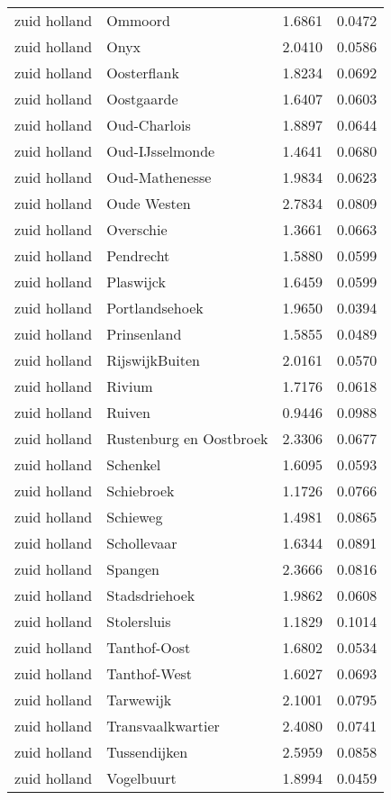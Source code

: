\begin{longtable}{llcc}
zuid holland & Ommoord & 1.6861 & 0.0472 \\
zuid holland & Onyx & 2.0410 & 0.0586 \\
zuid holland & Oosterflank & 1.8234 & 0.0692 \\
zuid holland & Oostgaarde & 1.6407 & 0.0603 \\
zuid holland & Oud-Charlois & 1.8897 & 0.0644 \\
zuid holland & Oud-IJsselmonde & 1.4641 & 0.0680 \\
zuid holland & Oud-Mathenesse & 1.9834 & 0.0623 \\
zuid holland & Oude Westen & 2.7834 & 0.0809 \\
zuid holland & Overschie & 1.3661 & 0.0663 \\
zuid holland & Pendrecht & 1.5880 & 0.0599 \\
zuid holland & Plaswijck & 1.6459 & 0.0599 \\
zuid holland & Portlandsehoek & 1.9650 & 0.0394 \\
zuid holland & Prinsenland & 1.5855 & 0.0489 \\
zuid holland & RijswijkBuiten & 2.0161 & 0.0570 \\
zuid holland & Rivium & 1.7176 & 0.0618 \\
zuid holland & Ruiven & 0.9446 & 0.0988 \\
zuid holland & Rustenburg en Oostbroek & 2.3306 & 0.0677 \\
zuid holland & Schenkel & 1.6095 & 0.0593 \\
zuid holland & Schiebroek & 1.1726 & 0.0766 \\
zuid holland & Schieweg & 1.4981 & 0.0865 \\
zuid holland & Schollevaar & 1.6344 & 0.0891 \\
zuid holland & Spangen & 2.3666 & 0.0816 \\
zuid holland & Stadsdriehoek & 1.9862 & 0.0608 \\
zuid holland & Stolersluis & 1.1829 & 0.1014 \\
zuid holland & Tanthof-Oost & 1.6802 & 0.0534 \\
zuid holland & Tanthof-West & 1.6027 & 0.0693 \\
zuid holland & Tarwewijk & 2.1001 & 0.0795 \\
zuid holland & Transvaalkwartier & 2.4080 & 0.0741 \\
zuid holland & Tussendijken & 2.5959 & 0.0858 \\
zuid holland & Vogelbuurt & 1.8994 & 0.0459 \\

\end{longtable}
